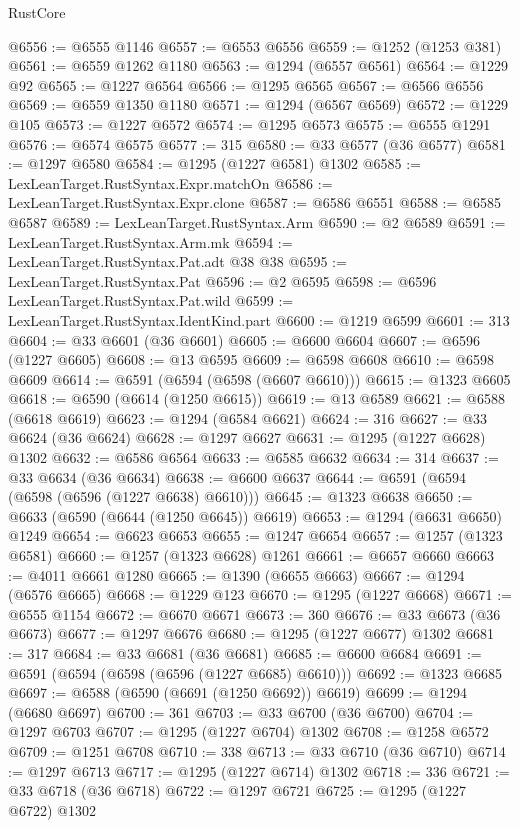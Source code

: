 \begin{lexlean}{RustCore}
\begin{coremodule}
@6556 := @6555 @1146
@6557 := @6553 @6556
@6559 := @1252 (@1253 @381)
@6561 := @6559 @1262 @1180
@6563 := @1294 (@6557 @6561)
@6564 := @1229 @92
@6565 := @1227 @6564
@6566 := @1295 @6565
@6567 := @6566 @6556
@6569 := @6559 @1350 @1180
@6571 := @1294 (@6567 @6569)
@6572 := @1229 @105
@6573 := @1227 @6572
@6574 := @1295 @6573
@6575 := @6555 @1291
@6576 := @6574 @6575
@6577 := 315
@6580 := @33 @6577 (@36 @6577)
@6581 := @1297 @6580
@6584 := @1295 (@1227 @6581) @1302
@6585 := LexLeanTarget.RustSyntax.Expr.matchOn
@6586 := LexLeanTarget.RustSyntax.Expr.clone
@6587 := @6586 @6551
@6588 := @6585 @6587
@6589 := LexLeanTarget.RustSyntax.Arm
@6590 := @2 @6589
@6591 := LexLeanTarget.RustSyntax.Arm.mk
@6594 := LexLeanTarget.RustSyntax.Pat.adt @38 @38
@6595 := LexLeanTarget.RustSyntax.Pat
@6596 := @2 @6595
@6598 := @6596 LexLeanTarget.RustSyntax.Pat.wild
@6599 := LexLeanTarget.RustSyntax.IdentKind.part
@6600 := @1219 @6599
@6601 := 313
@6604 := @33 @6601 (@36 @6601)
@6605 := @6600 @6604
@6607 := @6596 (@1227 @6605)
@6608 := @13 @6595
@6609 := @6598 @6608
@6610 := @6598 @6609
@6614 := @6591 (@6594 (@6598 (@6607 @6610)))
@6615 := @1323 @6605
@6618 := @6590 (@6614 (@1250 @6615))
@6619 := @13 @6589
@6621 := @6588 (@6618 @6619)
@6623 := @1294 (@6584 @6621)
@6624 := 316
@6627 := @33 @6624 (@36 @6624)
@6628 := @1297 @6627
@6631 := @1295 (@1227 @6628) @1302
@6632 := @6586 @6564
@6633 := @6585 @6632
@6634 := 314
@6637 := @33 @6634 (@36 @6634)
@6638 := @6600 @6637
@6644 := @6591 (@6594 (@6598 (@6596 (@1227 @6638) @6610)))
@6645 := @1323 @6638
@6650 := @6633 (@6590 (@6644 (@1250 @6645)) @6619)
@6653 := @1294 (@6631 @6650) @1249
@6654 := @6623 @6653
@6655 := @1247 @6654
@6657 := @1257 (@1323 @6581)
@6660 := @1257 (@1323 @6628) @1261
@6661 := @6657 @6660
@6663 := @4011 @6661 @1280
@6665 := @1390 (@6655 @6663)
@6667 := @1294 (@6576 @6665)
@6668 := @1229 @123
@6670 := @1295 (@1227 @6668)
@6671 := @6555 @1154
@6672 := @6670 @6671
@6673 := 360
@6676 := @33 @6673 (@36 @6673)
@6677 := @1297 @6676
@6680 := @1295 (@1227 @6677) @1302
@6681 := 317
@6684 := @33 @6681 (@36 @6681)
@6685 := @6600 @6684
@6691 := @6591 (@6594 (@6598 (@6596 (@1227 @6685) @6610)))
@6692 := @1323 @6685
@6697 := @6588 (@6590 (@6691 (@1250 @6692)) @6619)
@6699 := @1294 (@6680 @6697)
@6700 := 361
@6703 := @33 @6700 (@36 @6700)
@6704 := @1297 @6703
@6707 := @1295 (@1227 @6704) @1302
@6708 := @1258 @6572
@6709 := @1251 @6708
@6710 := 338
@6713 := @33 @6710 (@36 @6710)
@6714 := @1297 @6713
@6717 := @1295 (@1227 @6714) @1302
@6718 := 336
@6721 := @33 @6718 (@36 @6718)
@6722 := @1297 @6721
@6725 := @1295 (@1227 @6722) @1302

\end{coremodule}
\end{lexlean}
